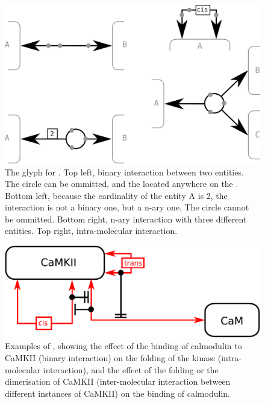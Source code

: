 \begin{figure}[H]
  \centering
  \includegraphics[scale = 0.3]{images/interaction}
  \caption{The \ER glyph for . Top left, binary interaction between two entities. The circle can be ommitted, and the  located anywhere on the . Bottom left, because the cardinality of the entity A is 2, the interaction is not a binary one, but a n-ary one. The circle cannot be ommitted. Bottom right, n-ary interaction with three different entities. Top right, intra-molecular interaction.}
  \label{fig:interaction}
\end{figure}

\begin{figure}[H]
  \centering
  \includegraphics[scale = 0.5]{examples/ex-interaction}
  \caption{Examples of , showing the effect of the binding of calmodulin to CaMKII (binary interaction) on the folding of the kinase (intra-molecular interaction), and the effect of the folding or the dimerisation of CaMKII (inter-molecular interaction between different instances of CaMKII) on the binding of calmodulin.}
  \label{fig:ex-interaction}
\end{figure}

